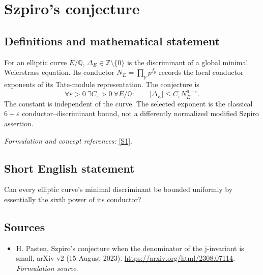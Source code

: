 \documentclass[11pt]{article}
\begin{document}
\section*{\texorpdfstring{Szpiro's conjecture}{Szpiro's conjecture}}\label{9400090}
\subsection{Definitions and mathematical statement}
For an elliptic curve $E/{\mathbb{Q}}$, $\Delta_E\in{\mathbb{Z}}\setminus\{0\}$ is the discriminant of a global minimal Weierstrass equation. Its conductor $N_E=\prod_p p^{f_p}$ records the local conductor exponents of its Tate-module representation. The conjecture is
\[
 \forall\varepsilon>0\ \exists C_\varepsilon>0\ \forall E/{\mathbb{Q}}:\qquad
 |\Delta_E|\le C_\varepsilon N_E^{6+\varepsilon}.
\]
The constant is independent of the curve. The selected exponent is the classical $6+\varepsilon$ conductor--discriminant bound, not a differently normalized modified Szpiro assertion.
\par\smallskip\textit{Formulation and concept references:} \href{https://arxiv.org/html/2308.07114}{[S1]}.

\subsection{Short English statement}
Can every elliptic curve's minimal discriminant be bounded uniformly by essentially the sixth power of its conductor?
\subsection{Sources}
\begin{itemize}
\item[S1]H. Pasten, Szpiro's conjecture when the denominator of the j-invariant is small, arXiv v2 (15 August 2023).
\url{https://arxiv.org/html/2308.07114}.
\textit{Formulation source.}
\end{itemize}
\end{document}
